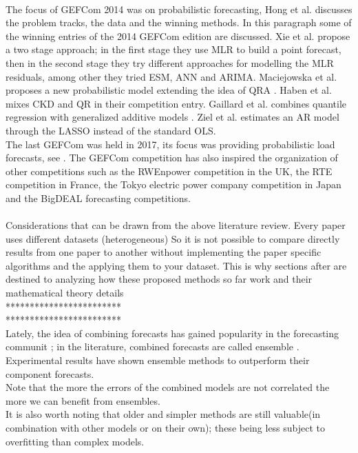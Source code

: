 \\
The focus of GEFCom 2014 was on probabilistic forecasting, Hong et al. \cite{hong2016probabilistic} discusses the problem tracks, the data and the winning methods.
In this paragraph some of the winning entries of the 2014 GEFCom edition are discussed.
Xie et al. \cite{xie2016gefcom2014} propose a two stage approach; in the first stage they use MLR to build a point forecast, then in the second stage they try different approaches for modelling the MLR residuals, among other they tried ESM, ANN and ARIMA. 
Maciejowska et al. \cite{maciejowska2016hybrid} proposes a new probabilistic model extending the idea of QRA \cite{nowotarski2015computing}.
Haben et al. \cite{haben2016hybrid} mixes CKD and QR in their competition entry.
Gaillard et al. \cite{gaillard2016additive} \cite{gaillardasemi} combines quantile regression with generalized additive models \cite{hastie2017generalized}.
Ziel et al. \cite{ziel2016lasso} estimates an AR model through the LASSO \cite{tibshirani1996regression} instead of the standard OLS.
\\
The last GEFCom was held in 2017, its focus was providing probabilistic load forecasts, see \cite{hong2019global}. The GEFCom competition has also inspired the organization of other competitions such as the RWEnpower competition in the UK, the RTE competition in France, the Tokyo electric power company competition in Japan and the BigDEAL forecasting competitions.
\\
\\
Considerations that can be drawn from the above literature review.
Every paper uses different datasets (heterogeneous)
So it is not possible to compare directly results
from one paper to another without implementing the
paper specific algorithms and the applying them to
your dataset.
This is why sections after are destined to analyzing
how these proposed methods so far work and their mathematical
theory details
\\
************************
\\
************************
\\
Lately, the idea of combining forecasts has gained popularity in the forecasting communit \cite{forecasting_big}; in the literature, combined forecasts are called ensemble \cite{gneiting_weather_ensemble}.
Experimental results have shown ensemble methods to outperform their component forecasts.
\\
Note that the more the errors of the combined models are not correlated the more we can benefit from ensembles.
\\
It is also worth noting that older and simpler methods are still valuable(in combination with other models or on their own); these being less subject to overfitting than complex models.
\\

